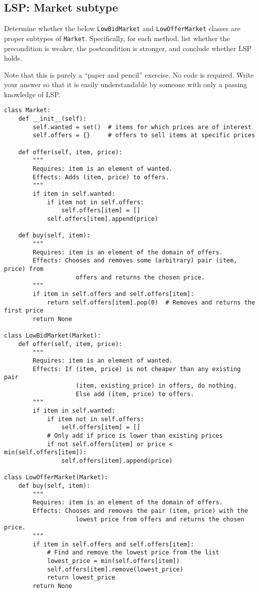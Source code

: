 \documentclass[oneside,11pt,dvipsnames]{book}
\newcommand{\code}[1]{\texttt{#1}}
\begin{document}
\subsection{LSP: Market subtype}

Determine whether the below \code{LowBidMarket} and \code{LowOfferMarket} classes are proper subtypes of \code{Market}. Specifically, for each method, list whether the precondition is weaker, the postcondition is stronger, and conclude whether LSP holds.

Note that this is purely a ``paper and pencil'' exercise. No code is required. Write your answer so that it is easily understandable by someone with only a passing knowledge of LSP.


\begin{lstlisting}
class Market:
    def __init__(self):
        self.wanted = set()  # items for which prices are of interest
        self.offers = {}     # offers to sell items at specific prices

    def offer(self, item, price):
        """
        Requires: item is an element of wanted.
        Effects: Adds (item, price) to offers.
        """
        if item in self.wanted:
            if item not in self.offers:
                self.offers[item] = []
            self.offers[item].append(price)

    def buy(self, item):
        """
        Requires: item is an element of the domain of offers.
        Effects: Chooses and removes some (arbitrary) pair (item, price) from
                    offers and returns the chosen price.
        """
        if item in self.offers and self.offers[item]:
            return self.offers[item].pop(0)  # Removes and returns the first price
        return None

class LowBidMarket(Market):
    def offer(self, item, price):
        """
        Requires: item is an element of wanted.
        Effects: If (item, price) is not cheaper than any existing pair
                    (item, existing_price) in offers, do nothing.
                    Else add (item, price) to offers.
        """
        if item in self.wanted:
            if item not in self.offers:
                self.offers[item] = []
            # Only add if price is lower than existing prices
            if not self.offers[item] or price < min(self.offers[item]):
                self.offers[item].append(price)

class LowOfferMarket(Market):
    def buy(self, item):
        """
        Requires: item is an element of the domain of offers.
        Effects: Chooses and removes the pair (item, price) with the 
                    lowest price from offers and returns the chosen price.
        """
        if item in self.offers and self.offers[item]:
            # Find and remove the lowest price from the list
            lowest_price = min(self.offers[item])
            self.offers[item].remove(lowest_price)
            return lowest_price
        return None                
\end{lstlisting}
\end{document}
